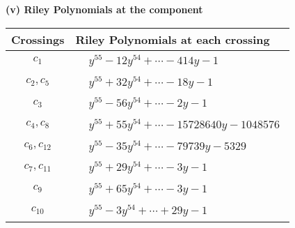 \documentclass[1p]{elsarticle_modified}
\theoremstyle{definition}
\begin{document}
\newpage\renewcommand{\arraystretch}{1}
\flushleft \textbf{(v) Riley Polynomials at the component}\newline \\
\begin{tabular}{m{50pt}|m{274pt}}
Crossings & \hspace{64pt}Riley Polynomials at each crossing \\
\hline $$\begin{aligned}c_{1}\end{aligned}$$&$\begin{aligned}
&y^{55}-12 y^{54}+\cdots-414 y-1
\end{aligned}$\\
\hline $$\begin{aligned}c_{2},c_{5}\end{aligned}$$&$\begin{aligned}
&y^{55}+32 y^{54}+\cdots-18 y-1
\end{aligned}$\\
\hline $$\begin{aligned}c_{3}\end{aligned}$$&$\begin{aligned}
&y^{55}-56 y^{54}+\cdots-2 y-1
\end{aligned}$\\
\hline $$\begin{aligned}c_{4},c_{8}\end{aligned}$$&$\begin{aligned}
&y^{55}+55 y^{54}+\cdots-15728640 y-1048576
\end{aligned}$\\
\hline $$\begin{aligned}c_{6},c_{12}\end{aligned}$$&$\begin{aligned}
&y^{55}-35 y^{54}+\cdots-79739 y-5329
\end{aligned}$\\
\hline $$\begin{aligned}c_{7},c_{11}\end{aligned}$$&$\begin{aligned}
&y^{55}+29 y^{54}+\cdots-3 y-1
\end{aligned}$\\
\hline $$\begin{aligned}c_{9}\end{aligned}$$&$\begin{aligned}
&y^{55}+65 y^{54}+\cdots-3 y-1
\end{aligned}$\\
\hline $$\begin{aligned}c_{10}\end{aligned}$$&$\begin{aligned}
&y^{55}-3 y^{54}+\cdots+29 y-1
\end{aligned}$\\
\hline
\end{tabular}\\~\\
\end{document}
